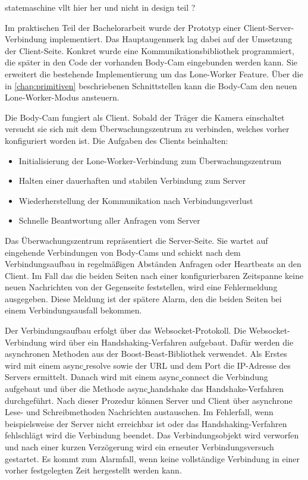 \documentclass[thesis.tex]{subfiles}
\begin{document}
statemaschine vllt hier her und nicht in design teil ?

Im praktischen Teil der Bachelorarbeit wurde der Prototyp einer Client-Server-Verbindung implementiert.
Das Hauptaugenmerk lag dabei auf der Umsetzung der Client-Seite.
Konkret wurde eine Kommunikationsbibliothek programmiert, die später in den Code der vorhanden Body-Cam eingebunden werden kann.
Sie erweitert die bestehende Implementierung um das Lone-Worker Feature.
Über die in \autoref{chap:primitiven} beschriebenen Schnittstellen kann die Body-Cam den neuen Lone-Worker-Modus ansteuern.

Die Body-Cam fungiert als Client.
Sobald der Träger die Kamera einschaltet versucht sie sich mit dem Überwachungszentrum zu verbinden, welches vorher konfiguriert worden ist.
Die Aufgaben des Clients beinhalten:
\begin{itemize}
    \item Initialisierung der Lone-Worker-Verbindung zum Überwachungszentrum
    \item Halten einer dauerhaften und stabilen Verbindung zum Server
    \item Wiederherstellung der Kommunikation nach Verbindungsverlust
    \item Schnelle Beantwortung aller Anfragen vom Server
\end{itemize}

Das Überwachungszentrum repräsentiert die Server-Seite.
Sie wartet auf eingehende Verbindungen von Body-Cams und schickt nach dem Verbindungsaufbau in regelmäßigen Abständen Anfragen oder Heartbeats an den Client.
Im Fall das die beiden Seiten nach einer konfigurierbaren Zeitspanne keine neuen Nachrichten von der Gegenseite feststellen, wird eine Fehlermeldung ausgegeben.
Diese Meldung ist der spätere Alarm, den die beiden Seiten bei einem Verbindungsausfall bekommen.

Der Verbindungsaufbau erfolgt über das Websocket-Protokoll.
Die Websocket-Verbindung wird über ein Handshaking-Verfahren aufgebaut.
Dafür werden die asynchronen Methoden aus der Boost-Beast-Bibliothek verwendet.
Als Erstes wird mit einem \glqq async\underline{ }resolve\grqq{} sowie der URL und dem Port die IP-Adresse des Servers ermittelt.
Danach wird mit einem \glqq async\underline{ }connect\grqq{} die Verbindung aufgebaut und über die Methode \glqq async\underline{ }handshake\grqq{} das Handshake-Verfahren durchgeführt.
Nach dieser Prozedur können Server und Client über asynchrone Lese- und Schreibmethoden Nachrichten austauschen.
Im Fehlerfall, wenn beispielsweise der Server nicht erreichbar ist oder das Handshaking-Verfahren fehlschlägt wird die Verbindung beendet.
Das Verbindungsobjekt wird verworfen und nach einer kurzen Verzögerung wird ein erneuter Verbindungsversuch gestartet.
Es kommt zum Alarmfall, wenn keine vollständige Verbindung in einer vorher festgelegten Zeit hergestellt werden kann.
\end{document}
